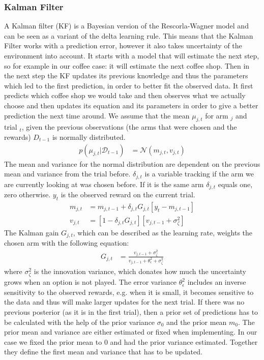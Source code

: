\subsubsection{Kalman Filter} %
A Kalman filter (KF) is a Bayesian version of the Rescorla-Wagner model \citep{gershman2015unifying} and can be seen as a variant of the delta learning rule. This means that the Kalman Filter works with a prediction error, however it also takes uncertainty of the environment into account. It starts with a model that will estimate the next step, so for example in our coffee case: it will estimate the next coffee shop. Then in the next step the KF updates its previous knowledge and thus the parameters which led to the first prediction, in order to better fit the observed data. It first predicts which coffee shop we would take and then observes what we actually choose and then updates its equation and its parameters in order to give a better prediction the next time around. We assume that the mean $\mu_{j,t}$ for arm $_j$ and trial $_t$, given the previous observations (the arms that were chosen and the rewards) $D_{t-1}$ is normally distributed.
\begin{align}
    p(\mu_{j,t}|\mathcal{D}_{t-1}) &= \mathcal{N}(m_{j,t},v_{j,t})
\end{align}
The mean and variance for the normal distribution are dependent on the previous mean and variance from the trial before. $\delta_{j,t}$ is a variable tracking if the arm we are currently looking at was chosen before. If it is the same arm $\delta_{j,t}$ equals one, zero otherwise. $y_t$ is the observed reward on the current trial. 
\begin{align}
    m_{j,t} &= m_{j,t-1} + \delta_{j,t}G_{j,t}\left[y_t-m_{j,t-1}\right]
    \\
    v_{j,t} &= \left[1 - \delta_{j,t}G_{j,t}\right]\left[v_{j,t-1}+\sigma_\zeta^2 \right]
\end{align}
The Kalman gain $G_{j,t}$, which can be described as the learning rate, weights the chosen arm with the following equation:  
\begin{align}
G_{j,t} &= \frac{v_{j,t-1}+\sigma_\zeta^2}{v_{j,t-1}+ \theta_\epsilon^2+\sigma_\zeta^2}
\end{align}
where $\sigma_\zeta^2$ is the innovation variance, which donates how much the uncertainty grows when an option is not played. The error variance $\theta_\epsilon^2$ includes an inverse sensitivity to the observed rewards, e.g. when it is small, it becomes sensitive to the data and thus will make larger updates for the next trial.
If there was no previous posterior (as it is in the first trial), then a prior set of predictions has to be calculated with the help of the prior variance $\sigma_0$ and the prior mean $m_0$. The prior mean and variance are either estimated or fixed when implementing. In our case we fixed the prior mean to 0 and had the prior variance estimated. Together they define the first mean and variance that has to be updated. 

